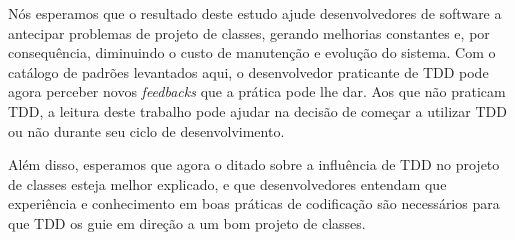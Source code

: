 Nós esperamos que o resultado deste estudo ajude desenvolvedores de software a antecipar
problemas de projeto de classes, gerando melhorias constantes e, por consequência, 
diminuindo o custo de manutenção e evolução do sistema.
Com o catálogo de padrões levantados aqui, o desenvolvedor praticante de TDD pode agora 
perceber novos \textit{feedbacks} que a prática pode lhe dar. Aos que não praticam TDD,
a leitura deste trabalho pode ajudar na decisão de começar a utilizar TDD ou não durante
seu ciclo de desenvolvimento.

Além disso, esperamos que agora o ditado sobre a influência de TDD no projeto de classes esteja
melhor explicado, e que desenvolvedores entendam que experiência e conhecimento em boas 
práticas de codificação são necessários para que TDD os guie em direção a um bom
projeto de classes.

